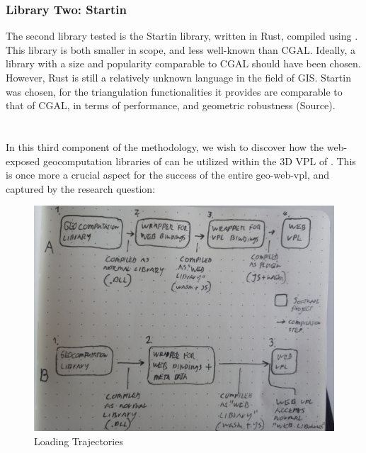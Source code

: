 \subsubsection*{Library Two: Startin}
The second library tested is the Startin library, written in Rust, compiled using .  
This library is both smaller in scope, and less well-known than CGAL. 
Ideally, a library with a size and popularity comparable to CGAL should have been chosen.
However, Rust is still a relatively unknown language in the field of GIS. 
Startin was chosen, for the triangulation functionalities it provides are comparable to that of CGAL, in terms of performance, and geometric robustness (Source). 


\section{\mySubRQThreeTitle} 
\label{sec:method-three}

In this third component of the methodology, we wish to discover how the web-exposed geocomputation libraries of  can be utilized within the 3D VPL of . 
This is once more a crucial aspect for the success of the entire \ac*{geo-web-vpl}, 
and captured by the research question: \mySubRQThree



\begin{figure}
  \centering
  \graphicspath{ {../../assets/images/4/} }
  \includegraphics[width=\linewidth]{loading-trajectory.png}
  \caption[Loading Trajectory]{Loading Trajectories}
  \label{fig:loading-trajectory}
\end{figure}

